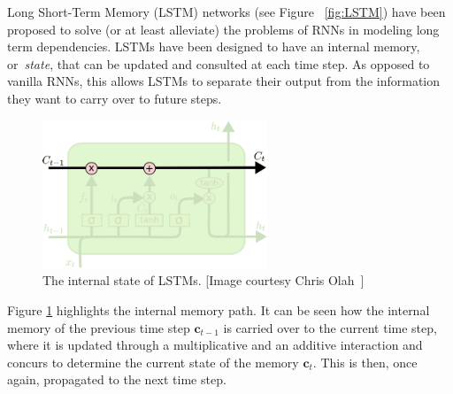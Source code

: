 Long Short-Term Memory (LSTM) networks (see Figure ~\ref{fig:LSTM}) have been proposed to solve (or at least alleviate) the problems of RNNs in modeling long term dependencies. LSTMs have been designed to have an internal memory, or~\emph{state}, that can be updated and consulted at each time step. As opposed to vanilla RNNs, this allows LSTMs to separate their output from the information they want to carry over to future steps.

\begin{figure}[t]
	\centering
	\includegraphics[width=0.6\textwidth]{figures/LSTM_state.pdf}
	\caption[The internal state of LSTMs]
	{The internal state of LSTMs. [Image courtesy Chris Olah~\cite{colah_15}]\label{fig:LSTM_state}}
\end{figure}

Figure \ref{fig:LSTM_state} highlights the internal memory path. It can be seen how the internal memory of the previous time step $\mathbf{c}_{t-1}$ is carried over to the current time step, where it is updated through a multiplicative and an additive interaction and concurs to determine the current state of the memory $\mathbf{c}_t$. This is then, once again, propagated to the next time step.


